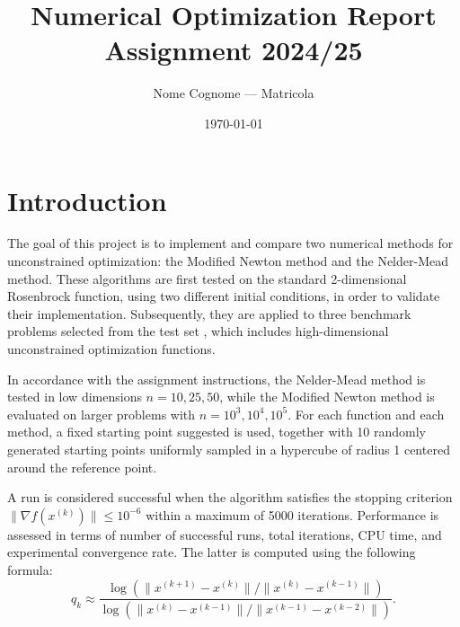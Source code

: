 \documentclass[a4paper,12pt]{article}
\begin{document}
	
	\title{\textbf{Numerical Optimization Report}\\
		\vspace{0.5em}\large Assignment 2024/25}
	\author{Nome Cognome — Matricola}
	\date{\today}
	\maketitle
	\thispagestyle{empty}   %
	\newpage                %
	
	\tableofcontents
	\newpage                %
	
	
	\section{Introduction}
	
	The goal of this project is to implement and compare two numerical methods for unconstrained optimization: the Modified Newton method and the Nelder-Mead method. These algorithms are first tested on the standard 2-dimensional Rosenbrock function, using two different initial conditions, in order to validate their implementation. Subsequently, they are applied to three benchmark problems selected from the test set , which includes high-dimensional unconstrained optimization functions.
	
	In accordance with the assignment instructions, the Nelder-Mead method is tested in low dimensions \( n = 10, 25, 50 \), while the Modified Newton method is evaluated on larger problems with \( n = 10^3, 10^4, 10^5 \). For each function and each method, a fixed starting point suggested is used, together with 10 randomly generated starting points uniformly sampled in a hypercube of radius 1 centered around the reference point.
	
	A run is considered successful when the algorithm satisfies the stopping criterion \( \|\nabla f(x^{(k)})\| \leq 10^{-6} \) within a maximum of 5000 iterations. Performance is assessed in terms of number of successful runs, total iterations, CPU time, and experimental convergence rate. The latter is computed using the following formula:
	\[
	q_k \approx \frac{\log\left(\|x^{(k+1)} - x^{(k)}\|\big/\|x^{(k)} - x^{(k-1)}\|\right)}{\log\left(\|x^{(k)} - x^{(k-1)}\|\big/\|x^{(k-1)} - x^{(k-2)}\|\right)}.
	\]
	
\end{document}

